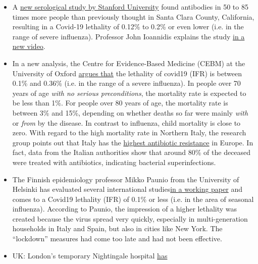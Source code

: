 \begin{itemize}
\tightlist
\item
  A
  \href{https://www.medrxiv.org/content/10.1101/2020.04.14.20062463v1}{new
  serological study by Stanford University} found antibodies in 50 to 85
  times more people than previously thought in Santa Clara County,
  California, resulting in a Covid-19 lethality of 0.12\% to 0.2\% or
  even lower (i.e. in the range of severe influenza). Professor John
  Ioannidis explains the study
  \href{https://www.youtube.com/watch?v=jGUgrEfSgaU}{in a new video}.
\item
  In a new analysis, the Centre for Evidence-Based Medicine (CEBM) at
  the University of Oxford
  \href{https://www.cebm.net/covid-19/global-covid-19-case-fatality-rates/}{argues
  that} the lethality of covid19 (IFR) is between 0.1\% and 0.36\% (i.e.
  in the range of a severe influenza). In people over 70 years of age
  \emph{with no serious preconditions}, the mortality rate is expected
  to be less than 1\%. For people over 80 years of age, the mortality
  rate is between 3\% and 15\%, depending on whether deaths so far were
  mainly \emph{with} or \emph{from} by the disease. In contrast to
  influenza, child mortality is close to zero. With regard to the high
  mortality rate in Northern Italy, the research group points out that
  Italy has the
  \href{https://www.ansa.it/english/news/science_tecnology/2019/11/19/italy-top-in-eu-in-antibiotic-resistance_369e0123-0107-445e-8c17-f11932c9d27c.html}{highest
  antibiotic resistance} in Europe. In fact, data from the Italian
  authorities show that around 80\% of the deceased were treated with
  antibiotics, indicating bacterial superinfections.
\item
  The Finnish epidemiology professor Mikko Paunio from the University of
  Helsinki has evaluated several international
  studies\href{https://lockdownsceptics.org/wp-content/uploads/2020/04/How-the-World-got-Fooled-by-COVID-ed-2c.pdf}{in
  a working paper} and comes to a Covid19 lethality (IFR) of 0.1\% or
  less (i.e. in the area of seasonal influenza). According to Paunio,
  the impression of a higher lethality was created because the virus
  spread very quickly, especially in multi-generation households in
  Italy and Spain, but also in cities like New York. The ``lockdown''
  measures had come too late and had not been effective.
\item
  UK: London's temporary Nightingale hospital
  \href{https://www.hsj.co.uk/service-design/exclusive-nightingale-largely-empty-as-icus-handle-surge/7027398.article}{has
}
\end{itemize}
